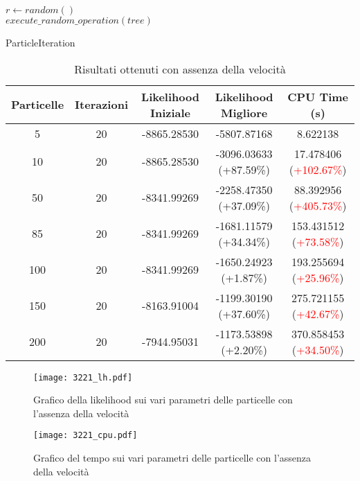 \begin{algorithm}[!h]
    $r \gets random()$ \\
    $execute\_random\_operation(tree)$
    \caption{ParticleIteration}
    \label{algo:pso-adapt-calculate-1}
\end{algorithm}
\begin{table}[!h]
  \centering
  \begin{tabular}{*{5}{c}}
    Particelle & Iterazioni & Likelihood Iniziale & Likelihood Migliore & CPU Time (s) \\ \midrule \midrule
    5 & 20 & -8865.28530 & -5807.87168 & 8.622138 \\
    10 & 20 & -8865.28530 & -3096.03633 (\textcolor{ao(english)}{+87.59\%}) & 17.478406 (\textcolor{red}{+102.67\%})\\
    50 & 20 & -8341.99269 & -2258.47350 (\textcolor{ao(english)}{+37.09\%}) & 88.392956 (\textcolor{red}{+405.73\%}) \\
    85 & 20 & -8341.99269 & -1681.11579 (\textcolor{ao(english)}{+34.34\%}) & 153.431512 (\textcolor{red}{+73.58\%}) \\
    100 & 20 & -8341.99269 & -1650.24923 (\textcolor{ao(english)}{+1.87\%}) & 193.255694 (\textcolor{red}{+25.96\%}) \\
    150 & 20 & -8163.91004 & -1199.30190 (\textcolor{ao(english)}{+37.60\%}) & 275.721155 (\textcolor{red}{+42.67\%}) \\
    200 & 20 & -7944.95031 & -1173.53898 (\textcolor{ao(english)}{+2.20\%}) & 370.858453 (\textcolor{red}{+34.50\%})
  \end{tabular}
  \caption{Risultati ottenuti con assenza della velocità}
  \label{tab:pso-adapt-calculate-1-table}
\end{table}
\begin{figure}[!h]
  \centering
  \begin{minipage}{.45 \textwidth}
  \centering
  \texttt{[image: 3221\_lh.pdf]}
  \caption{Grafico della likelihood sui vari parametri delle particelle con l'assenza della velocità}
  \end{minipage}
  \begin{minipage}{.45 \textwidth}
    \centering
    \texttt{[image: 3221\_cpu.pdf]}
    \caption{Grafico del tempo sui vari parametri delle particelle con l'assenza della velocità}
  \end{minipage}
  \label{fig:pso-adapt-calculate-1-graph}
\end{figure}
